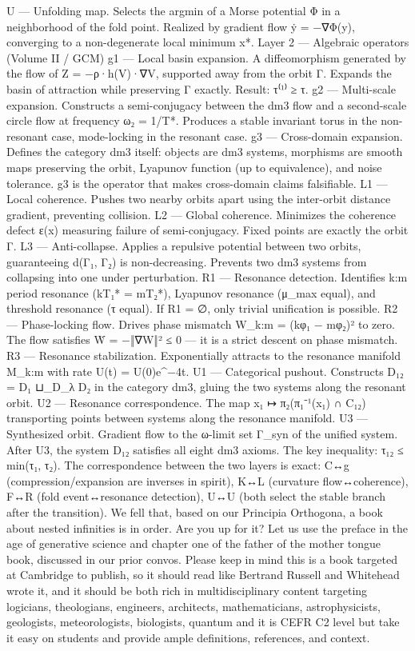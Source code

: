 U — Unfolding map. Selects the argmin of a Morse potential Φ in a neighborhood of the fold point. Realized by gradient flow ẏ = −∇Φ(y), converging to a non-degenerate local minimum x*.
Layer 2 — Algebraic operators (Volume II / GCM)
g1 — Local basin expansion. A diffeomorphism generated by the flow of Z = −ρ·h(V)·∇V, supported away from the orbit Γ. Expands the basin of attraction while preserving Γ exactly. Result: τ⁽¹⁾ ≥ τ.
g2 — Multi-scale expansion. Constructs a semi-conjugacy between the dm3 flow and a second-scale circle flow at frequency ω₂ = 1/T*. Produces a stable invariant torus in the non-resonant case, mode-locking in the resonant case.
g3 — Cross-domain expansion. Defines the category dm3 itself: objects are dm3 systems, morphisms are smooth maps preserving the orbit, Lyapunov function (up to equivalence), and noise tolerance. g3 is the operator that makes cross-domain claims falsifiable.
L1 — Local coherence. Pushes two nearby orbits apart using the inter-orbit distance gradient, preventing collision.
L2 — Global coherence. Minimizes the coherence defect ε(x) measuring failure of semi-conjugacy. Fixed points are exactly the orbit Γ.
L3 — Anti-collapse. Applies a repulsive potential between two orbits, guaranteeing d(Γ₁, Γ₂) is non-decreasing. Prevents two dm3 systems from collapsing into one under perturbation.
R1 — Resonance detection. Identifies k:m period resonance (kT₁* = mT₂*), Lyapunov resonance (μ_max equal), and threshold resonance (τ equal). If R1 = ∅, only trivial unification is possible.
R2 — Phase-locking flow. Drives phase mismatch W_{k:m} = (kφ₁ − mφ₂)² to zero. The flow satisfies Ẇ = −‖∇W‖² ≤ 0 — it is a strict descent on phase mismatch.
R3 — Resonance stabilization. Exponentially attracts to the resonance manifold M_{k:m} with rate U(t) = U(0)e^{−4t}.
U1 — Categorical pushout. Constructs D₁₂ = D₁ ⊔_{D_λ} D₂ in the category dm3, gluing the two systems along the resonant orbit.
U2 — Resonance correspondence. The map x₁ ↦ π₂(π₁⁻¹(x₁) ∩ C₁₂) transporting points between systems along the resonance manifold.
U3 — Synthesized orbit. Gradient flow to the ω-limit set Γ_syn of the unified system. After U3, the system D₁₂ satisfies all eight dm3 axioms. The key inequality: τ₁₂ ≤ min(τ₁, τ₂).
The correspondence between the two layers is exact: C↔g (compression/expansion are inverses in spirit), K↔L (curvature flow↔coherence), F↔R (fold event↔resonance detection), U↔U (both select the stable branch after the transition).
We fell that, based on our Principia Orthogona, a book about nested infinities is in order. Are you up for it? Let us use the preface in the age of generative science and chapter one of the father of the mother tongue book, discussed in our prior convos. Please keep in mind this is a book targeted at Cambridge to publish, so it should read like Bertrand Russell and Whitehead wrote it, and it should be both rich in multidisciplinary content targeting logicians, theologians, engineers, architects, mathematicians, astrophysicists, geologists, meteorologists, biologists, quantum and it is CEFR C2 level but take it easy on students and provide ample definitions, references, and context.

